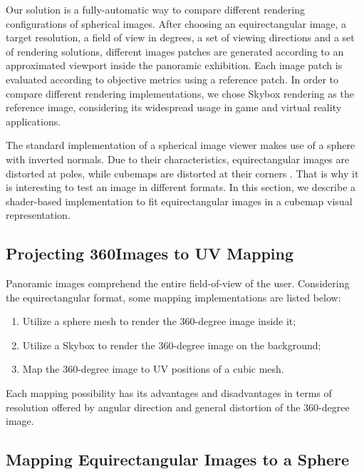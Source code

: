 \documentclass[10pt,conference,pdftex]{IEEEtran}
\begin{document}
Our solution is a fully-automatic way to compare different rendering configurations of spherical images. After choosing an equirectangular image, a target resolution, a field of view in degrees, a set of viewing directions and a set of rendering solutions, different images patches are generated according to an approximated viewport inside the panoramic exhibition. Each image patch is evaluated according to objective metrics using a reference patch. In order to compare different rendering implementations, we chose Skybox rendering as the reference image, considering its widespread usage in game and virtual reality applications.

The standard implementation of a spherical image viewer makes use of a sphere with inverted normals. Due to their characteristics, equirectangular images are distorted at poles, while cubemaps are distorted at their corners \cite{dunn2017resolution}. That is why it is interesting to test an image in different formats. In this section, we describe a shader-based implementation to fit equirectangular images in a cubemap visual representation.


\subsection{Projecting 360\degree Images to UV Mapping} \label{sec:uvmapping}

Panoramic images comprehend the entire field-of-view of the user. Considering the
equirectangular format, some mapping implementations are listed below:

\begin{enumerate}
    \item Utilize a sphere mesh to render the 360-degree image inside it;
    \item Utilize a Skybox to render the 360-degree image on the background;
    \item Map the 360-degree image to UV positions of a cubic mesh.
\end{enumerate}

Each mapping possibility has its advantages and disadvantages in terms of resolution offered by angular direction and general distortion of the 360-degree image.

\subsection{Mapping Equirectangular Images to a Sphere}
\end{document}
